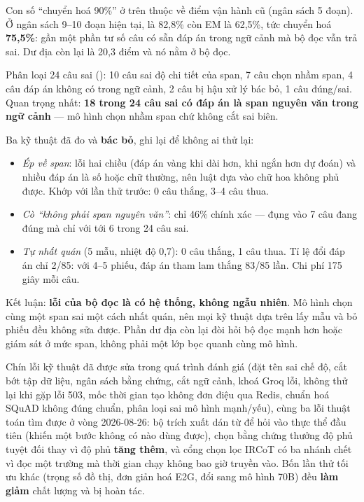 \begin{luuy}
Con số ``chuyển hoá 90\%'' ở trên thuộc về điểm vận hành cũ (ngân sách 5 đoạn).
Ở ngân sách 9--10 đoạn hiện tại,  là 82,8\% còn EM là
62,5\%, tức chuyển hoá \textbf{75,5\%}: gần một phần tư số câu có sẵn đáp án trong
ngữ cảnh mà bộ đọc vẫn trả sai. Dư địa còn lại là 20,3 điểm và nó nằm ở bộ đọc.

Phân loại 24 câu sai (): 10 câu sai độ chi tiết
của span, 7 câu chọn nhầm span, 4 câu đáp án không có trong ngữ cảnh, 2 câu bị hậu
xử lý bác bỏ, 1 câu đúng/sai. Quan trọng nhất: \textbf{18 trong 24 câu sai có đáp án
là span nguyên văn trong ngữ cảnh} --- mô hình chọn nhầm span chứ không cắt sai biên.

Ba kỹ thuật đã đo và \textbf{bác bỏ}, ghi lại để không ai thử lại:
\begin{itemize}
  \item \emph{Ép về span}: lỗi hai chiều (đáp án vàng khi dài hơn, khi ngắn hơn dự
        đoán) và nhiều đáp án là số hoặc chữ thường, nên luật dựa vào chữ hoa không
        phủ được. Khớp với lần thử trước: 0 câu thắng, 3--4 câu thua.
  \item \emph{Cò ``không phải span nguyên văn''}: chỉ 46\% chính xác --- đụng vào 7
        câu đang đúng mà chỉ với tới 6 trong 24 câu sai.
  \item \emph{Tự nhất quán} (5 mẫu, nhiệt độ 0,7): 0 câu thắng, 1 câu thua. Tỉ lệ đổi
        đáp án chỉ 2/85: với 4--5 phiếu, đáp án tham lam thắng 83/85 lần. Chi phí
        175 giây mỗi câu.
\end{itemize}

Kết luận: \textbf{lỗi của bộ đọc là có hệ thống, không ngẫu nhiên}. Mô hình chọn cùng
một span sai một cách nhất quán, nên mọi kỹ thuật dựa trên lấy mẫu và bỏ phiếu đều
không sửa được. Phần dư địa còn lại đòi hỏi bộ đọc mạnh hơn hoặc giám sát ở mức span,
không phải một lớp bọc quanh cùng mô hình.
\end{luuy}

Chín lỗi kỹ thuật đã được sửa trong quá trình đánh giá (đặt tên sai chế độ, cắt bớt tập dữ
liệu, ngân sách bằng chứng, cắt ngữ cảnh, khoá Groq lỗi, không thử lại khi gặp lỗi 503,
mốc thời gian tạo không đơn điệu qua Redis, chuẩn hoá SQuAD không đúng chuẩn, phân loại sai
mô hình mạnh/yếu), cùng ba lỗi thuật toán tìm được ở vòng 2026-08-26: bộ trích xuất
 dán từ để hỏi vào thực thể đầu tiên (khiến một bước không có  nào
dùng được), chọn bằng chứng thưởng độ phủ tuyệt đối thay vì độ phủ \textbf{tăng thêm}, và
cổng chọn lọc IRCoT có ba nhánh chết vì đọc một trường mà thời gian chạy không bao giờ
truyền vào. Bốn lần thử tối ưu khác (trọng số đồ thị, đơn giản hoá E2G, đổi sang mô hình
70B) đều \textbf{làm giảm} chất lượng và bị hoàn tác.

